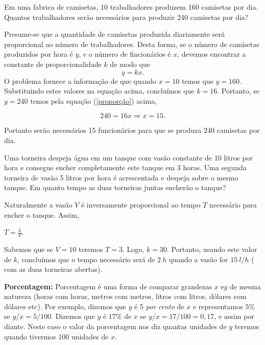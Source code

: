 \begin{ex} Em uma fabrica de camisetas, 10 trabalhadores produzem 160 camisetas por dia. Quantos trabalhadores serão necessários para produzir 240 camisetas por dia?

Presume-se que a quantidade de camisetas  produzida diariamente será proporcional ao número de trabalhadores. Desta forma,
se o número de camisetas produzidos por hora é $y$, e o número de fincionários é $x$, devemos encontrar a constante de proporcionalidade $k$ de modo que
\begin{equation}\label{proporção}y=kx.\end{equation}
O problema fornece a informação de que quando $x=10$ temos que $y=160$. Substituindo estes valores na equação acima, concluímos que $k=16$. Portanto, se $y=240$ temos pela equação (\ref{proporção}) acima,

$$240= 16x\Rightarrow x=15.$$

Portanto serão necessários 15 funcionários para que se produza 240 camisetas por dia.
\end{ex}

\begin{ex} Uma torneira despeja água em um tanque com vasão constante de 10 litros por hora e consegue encher completamente este tanque em 3 horas. Uma segunda torneira de vasão 5 litros por hora é acrescentada e despeja sobre o mesmo tanque. Em quanto tempo as duas torneiras juntas encherão o tanque?

Naturalmente a vasão $V$ é inversamente proporcional ao tempo $T$ necessário para encher o tanque. Assim,

$T=\frac{k}{V}.$

Sabemos que se $V=10$ teremos $T=3$. Logo, $k=30$. Portanto, usando este valor de $k$, concluímos que o tempo necessário será de $2\ h$ quando a vasão for  $15\  l/h$ ( com as duas torneiras abertas).

\end{ex}



\noindent\textbf{ Porcentagem:} Porcentagem é uma forma de comparar grandezas $x$ e$ y$ de mesma natureza (horas com horas, metros com metros, litros com litros, dólares com dólares etc).  Por exemplo, dizemos que $y$ é 5 \textit{por cento} de $x$ e representamos $5\%$  se $y/x=5/100$. Dizemos que $y$ é $17\%$ de $x$  se $y/x=17/100=0,17$, e assim por diante. Neste caso
o valor da porcentagem nos diz quantas unidades de $y$ teremos quando tivermos $100$ unidades de $x$.

